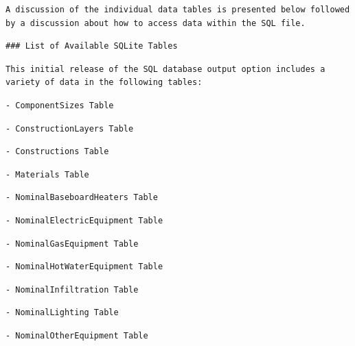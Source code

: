 \begin{lstlisting}
A discussion of the individual data tables is presented below followed by a discussion about how to access data within the SQL file.
\end{lstlisting}

\begin{lstlisting}
### List of Available SQLite Tables
\end{lstlisting}

\begin{lstlisting}
This initial release of the SQL database output option includes a variety of data in the following tables:
\end{lstlisting}

\begin{lstlisting}
- ComponentSizes Table
\end{lstlisting}

\begin{lstlisting}
- ConstructionLayers Table
\end{lstlisting}

\begin{lstlisting}
- Constructions Table
\end{lstlisting}

\begin{lstlisting}
- Materials Table
\end{lstlisting}

\begin{lstlisting}
- NominalBaseboardHeaters Table
\end{lstlisting}

\begin{lstlisting}
- NominalElectricEquipment Table
\end{lstlisting}

\begin{lstlisting}
- NominalGasEquipment Table
\end{lstlisting}

\begin{lstlisting}
- NominalHotWaterEquipment Table
\end{lstlisting}

\begin{lstlisting}
- NominalInfiltration Table
\end{lstlisting}

\begin{lstlisting}
- NominalLighting Table
\end{lstlisting}

\begin{lstlisting}
- NominalOtherEquipment Table
\end{lstlisting}

